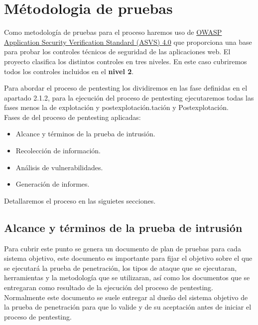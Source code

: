 \section{Métodologia de pruebas} 
Como metodología de pruebas para el proceso haremos uso 
de \href{https://owasp.org/www-pdf-archive/OWASP_Application_Security_Verification_Standard_4.0-en.pdf}{OWASP Application Security Verification Standard (ASVS) 4.0} 
que proporciona una base para probar los controles técnicos de seguridad de las aplicaciones web. El proyecto clasifica
 los distintos controles en tres niveles. En este caso cubriremos todos los controles incluidos en el \textbf{nivel 2}.

 Para abordar el proceso de pentesting los dividiremos en las fase definidas en el 
 apartado 2.1.2, para la ejecución del proceso de pentesting ejecutaremos todas las fases menos la 
 de explotación y postexplotación.tación y Postexplotación.\\

 Fases de del proceso de pentesting aplicadas:\\
 \begin{itemize}
     \item Alcance y términos de la prueba de intrusión.
     \item Recolección de información.
     \item Análisis de vulnerabilidades.
     \item Generación de informes.
 \end{itemize}
 
 Detallaremos el proceso en las siguietes secciones.
\clearpage
\newpage

\subsection{Alcance y términos de la prueba de intrusión}
Para cubrir este punto se genera un documento de plan de pruebas para cada sistema objetivo, este documento es 
importante para fijar el objetivo sobre el que se ejecutará la prueba de penetración, 
los tipos de ataque que se ejecutaran, herramientas y la metodología que se utilizaran, así como los documentos que se entregaran 
como resultado de la ejecución del proceso de pentesting.\\

Normalmente este documento se suele entregar al dueño del sistema objetivo de la prueba de penetración para que 
lo valide y de su aceptación antes de iniciar el proceso de pentesting.

